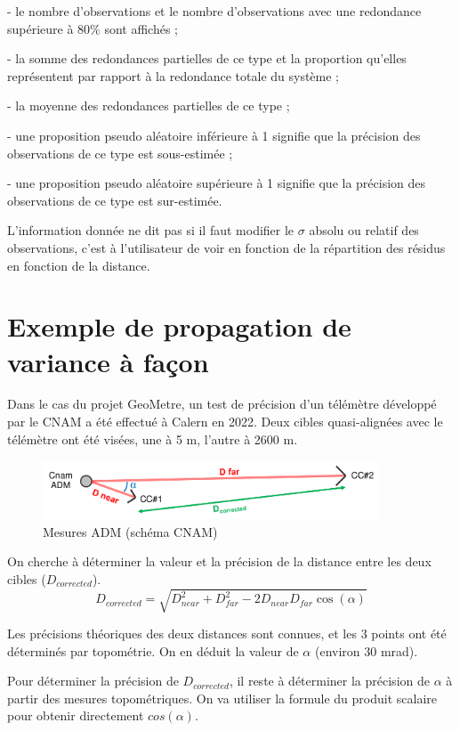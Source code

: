 \documentclass[french]{report}
\begin{document}
   -  le nombre d'observations et le nombre d'observations avec une
      redondance supérieure à $80\%$ sont affichés ;

   -  la somme des redondances partielles de ce type et la proportion
      qu'elles représentent par rapport à la redondance totale du
      système ;

   -  la moyenne des redondances partielles de ce type ;

-  une proposition pseudo aléatoire inférieure à 1 signifie que la
   précision des observations de ce type est sous-estimée ;

-  une proposition pseudo aléatoire supérieure à 1 signifie que la
   précision des observations de ce type est sur-estimée.

L'information donnée ne dit pas si il faut modifier le $\sigma$
absolu ou relatif des observations, c'est à l'utilisateur de voir en
fonction de la répartition des résidus en fonction de la distance.



\section{Exemple de propagation de variance à façon}

Dans le cas du projet GeoMetre, un test de précision d'un télémètre développé par le CNAM
a été effectué à Calern en 2022.
Deux cibles quasi-alignées avec le télémètre ont été visées, une à 5 m, l'autre à 2600 m.

\begin{figure}[!h]
   \centering
  \includegraphics[width = 10cm]{images/cnam_dist}
  \caption{Mesures ADM (schéma CNAM)}
\end{figure}

On cherche à déterminer la valeur et la précision de la distance entre les deux cibles ($D_{corrected}$).
$$D_{corrected} = \sqrt{D_{near}^2 + D_{far}^2 - 2 D_{near} D_{far} \cos(\alpha)}$$

Les précisions théoriques des deux distances sont connues, et les 3 points ont été déterminés
par topométrie. On en déduit la valeur de $\alpha$ (environ $30$ mrad).


Pour déterminer la précision de $D_{corrected}$, il reste à déterminer la précision de $\alpha$ à partir des mesures topométriques.
On va utiliser la formule du produit scalaire pour obtenir directement $cos(\alpha)$.
\end{document}
